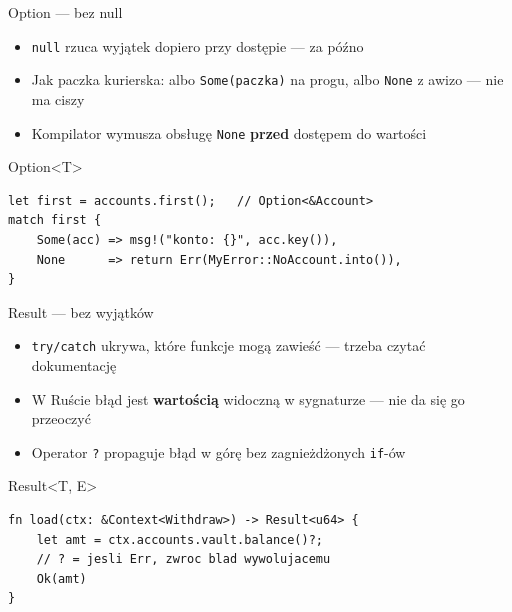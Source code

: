 \begin{frame}[fragile]{Option --- bez null}
  \begin{itemize}
    \item \texttt{null} rzuca wyjątek dopiero przy dostępie --- za późno
    \item Jak paczka kurierska: albo \texttt{Some(paczka)} na progu, albo \texttt{None} z awizo --- nie ma ciszy
    \item Kompilator wymusza obsługę \texttt{None} \textbf{przed} dostępem do wartości
  \end{itemize}
  \begin{exampleblock}{Option\textless{}T\textgreater{}}
\begin{lstlisting}
let first = accounts.first();   // Option<&Account>
match first {
    Some(acc) => msg!("konto: {}", acc.key()),
    None      => return Err(MyError::NoAccount.into()),
}
\end{lstlisting}
  \end{exampleblock}
\end{frame}

\begin{frame}[fragile]{Result --- bez wyjątków}
  \begin{itemize}
    \item \texttt{try/catch} ukrywa, które funkcje mogą zawieść --- trzeba czytać dokumentację
    \item W Ruście błąd jest \textbf{wartością} widoczną w sygnaturze --- nie da się go przeoczyć
    \item Operator \texttt{?} propaguje błąd w górę bez zagnieżdżonych \texttt{if}-ów
  \end{itemize}
  \begin{alertblock}{Result\textless{}T, E\textgreater{}}
\begin{lstlisting}
fn load(ctx: &Context<Withdraw>) -> Result<u64> {
    let amt = ctx.accounts.vault.balance()?;
    // ? = jesli Err, zwroc blad wywolujacemu
    Ok(amt)
}
\end{lstlisting}
  \end{alertblock}
\end{frame}

